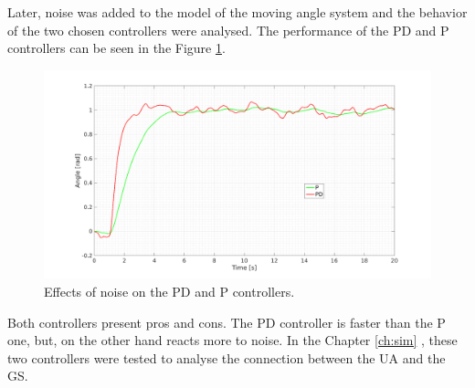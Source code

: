 Later, noise was added to the model of the moving angle system and the behavior of the two chosen controllers were analysed. The performance of the PD and P controllers can be seen in the Figure \ref{fig:noise_PID}.

\begin{figure}[H]
\centerline{
\includegraphics[scale=0.35]{figures/PD_noise.png}}
\caption{Effects of noise on the PD and P controllers.}
\label{fig:noise_PID}
\end{figure}

Both controllers present pros and cons. The PD controller is faster than the P one, but, on the other hand reacts more to noise. In the Chapter \ref{ch:sim} , these two controllers were tested to analyse the connection between the UA and the GS.